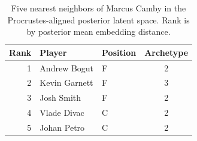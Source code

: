 \begin{table}[htbp]
  \centering\small
  \begin{tabular}{rllc}
    \toprule
    Rank & Player & Position & Archetype \\
    \midrule
    1 & Andrew Bogut & F & 2 \\
    2 & Kevin Garnett & F & 3 \\
    3 & Josh Smith & F & 2 \\
    4 & Vlade Divac & C & 2 \\
    5 & Johan Petro & C & 2 \\
    \bottomrule
  \end{tabular}
  \caption{Five nearest neighbors of Marcus Camby in the Procrustes-aligned posterior latent space. Rank is by posterior mean embedding distance.}
  \label{tab:Marcus_Camby_neighbors}
\end{table}

